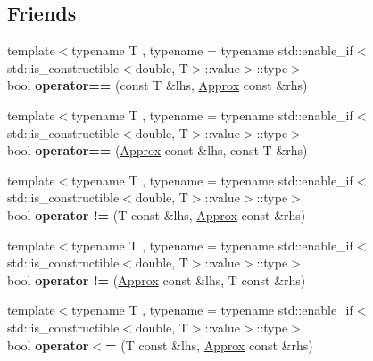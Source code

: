 \subsection*{Friends}
\begin{DoxyCompactItemize}
\item 
\mbox{\label{classCatch_1_1Detail_1_1Approx_ab38782a37d09b527ca5e126dbf433dda}} 
{\footnotesize template$<$typename T , typename  = typename std\+::enable\+\_\+if$<$std\+::is\+\_\+constructible$<$double, T$>$\+::value$>$\+::type$>$ }\\bool {\bfseries operator==} (const T \&lhs, \mbox{\hyperlink{classCatch_1_1Detail_1_1Approx}{Approx}} const \&rhs)
\item 
\mbox{\label{classCatch_1_1Detail_1_1Approx_a0e5ef1957d4c38d7857005909c613743}} 
{\footnotesize template$<$typename T , typename  = typename std\+::enable\+\_\+if$<$std\+::is\+\_\+constructible$<$double, T$>$\+::value$>$\+::type$>$ }\\bool {\bfseries operator==} (\mbox{\hyperlink{classCatch_1_1Detail_1_1Approx}{Approx}} const \&lhs, const T \&rhs)
\item 
\mbox{\label{classCatch_1_1Detail_1_1Approx_ad878de1a82eb134e32d3434bb3fddd54}} 
{\footnotesize template$<$typename T , typename  = typename std\+::enable\+\_\+if$<$std\+::is\+\_\+constructible$<$double, T$>$\+::value$>$\+::type$>$ }\\bool {\bfseries operator !=} (T const \&lhs, \mbox{\hyperlink{classCatch_1_1Detail_1_1Approx}{Approx}} const \&rhs)
\item 
\mbox{\label{classCatch_1_1Detail_1_1Approx_a0902653024d8e11e76632b2faa1f6bd5}} 
{\footnotesize template$<$typename T , typename  = typename std\+::enable\+\_\+if$<$std\+::is\+\_\+constructible$<$double, T$>$\+::value$>$\+::type$>$ }\\bool {\bfseries operator !=} (\mbox{\hyperlink{classCatch_1_1Detail_1_1Approx}{Approx}} const \&lhs, T const \&rhs)
\item 
\mbox{\label{classCatch_1_1Detail_1_1Approx_a0369de03e81bc2ceaf6c9d830476bd49}} 
{\footnotesize template$<$typename T , typename  = typename std\+::enable\+\_\+if$<$std\+::is\+\_\+constructible$<$double, T$>$\+::value$>$\+::type$>$ }\\bool {\bfseries operator$<$=} (T const \&lhs, \mbox{\hyperlink{classCatch_1_1Detail_1_1Approx}{Approx}} const \&rhs)

\end{DoxyCompactItemize}
